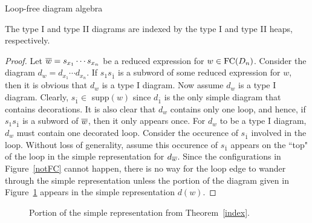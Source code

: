 \begin{section}{Loop-free diagram algebra}
\begin{theorem}\label{index}
The type I and type II diagrams are indexed by the type I and type II heaps, respectively.
\end{theorem}

\begin{proof}
Let $\overline{w}=s_{x_{1}}\cdots s_{x_{n}}$ be a reduced expression for $w\in\operatorname{FC}(D_n)$. Consider the diagram $d_{w}=d_{x_{1}}\cdots d_{x_{n}}$. If $s_{1}s_{\overline{1}}$ is a subword of some reduced expression for $w$, then it is obvious that $d_{w}$  is a type I diagram. Now assume $d_{w}$ is a type I diagram. Clearly, $s_{\overline{1}}\in$ supp$(w)$ since $d_{\overline{1}}$ is the only simple diagram that contains decorations. It is also clear that $d_{w}$ contains only one loop, and hence, if $s_{1}s_{\overline{1}}$ is a subword of $\overline{w}$, then it only appears once. 
For $d_{w}$ to be a type I diagram, $d_{w}$ must contain one decorated loop. Consider the occurence of $s_{\overline{1}}$ involved in the loop. Without loss of generality, assume this occurence of $s_{\overline{1}}$ appears on the ``top" of the loop in the simple representation for $d_{\overline{w}}$. Since the configurations in Figure~\ref{notFC} cannot happen, there is no way for the loop edge to wander through the simple representation unless the portion of the diagram given in Figure~\ref{1bar1} appears in the simple representation $d(w)$.
\end{proof}

\begin{figure}[h]
\centering
\caption{Portion of the simple representation from Theorem~\ref{index}.}
\label{1bar1}
\end{figure}




\end{section}
